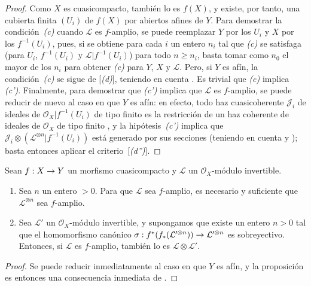 \documentclass[oneside,10pt]{amsart}
\makeatletter
\renewcommand{\geq}{\geqslant}
\newcommand{\ega@arrow}[2]{\mathchoice{#1}{#2}{#2}{#2}}
\renewcommand{\to}{\ega@arrow{\longrightarrow}{\rightarrow}}
\newcommand{\oldpage}[2][]{\marginnote{\normalfont\footnotesize\textbf{#1}~|~#2}\ignorespaces}
\let\EGAOriginalLabel\label
\renewcommand{\label}[1]{\phantomsection\EGAOriginalLabel{#1}}
\makeatother
\begin{document}
\begin{proof}
Como $X$ es cuasicompacto, también lo es $f(X)$, y existe, por tanto, una cubierta finita $(U_i)$ de $f(X)$ por abiertos afines de $Y$.
Para demostrar la condición~\emph{(c)} cuando $\mathcal{L}$ es $f$-amplio, se puede reemplazar $Y$ por los $U_i$ y $X$ por los $f^{-1}(U_i)$, pues, si se obtiene para cada $i$ un entero $n_i$ tal que \emph{(c)} se satisfaga (para $U_i$, $f^{-1}(U_i)$ y $\mathcal{L}|f^{-1}(U_i)$) para todo $n\geq n_i$, basta tomar como $n_0$ el mayor de los $n_i$ para obtener \emph{(c)} para $Y$, $X$ y $\mathcal{L}$.
Pero, si $Y$ es afín, la condición~\emph{(c)} se sigue de [\emph{(d)}], teniendo en cuenta .
Es trivial que \emph{(c)} implica \emph{(c')}.
Finalmente, para demostrar que \emph{(c')} implica que $\mathcal{L}$ es $f$-amplio, se puede reducir de nuevo al caso en que $Y$ es afín:
en efecto, todo haz cuasicoherente $\mathcal{J}_i$ de ideales de $\mathcal{O}_X|f^{-1}(U_i)$ de tipo finito es la restricción de un haz coherente de ideales de $\mathcal{O}_X$ de tipo finito , y la hipótesis~\emph{(c')} implica que
\oldpage[II]{91}
$\mathcal{J}_i\otimes(\mathcal{L}^{\otimes n}|f^{-1}(U_i))$ está generado por sus secciones (teniendo en cuenta  y );
basta entonces aplicar el criterio~[\emph{(d'')}].
\end{proof}

\begin{proposition}[4.6.9]
\label{II.4.6.9-fr}
Sean $f:X\to Y$ un morfismo cuasicompacto y $\mathcal{L}$ un $\mathcal{O}_X$-módulo invertible.
\begin{enumerate}
  \item[\rm{(i)}] Sea $n$ un entero $>0$.
    Para que $\mathcal{L}$ sea $f$-amplio, es necesario y suficiente que $\mathcal{L}^{\otimes n}$ sea $f$-amplio.
  \item[\rm{(ii)}] Sea $\mathcal{L}'$ un $\mathcal{O}_X$-módulo invertible, y supongamos que existe un entero $n>0$ tal que el homomorfismo canónico $\sigma:f^*(f_*(\mathcal{L}'^{\otimes n}))\to
  \mathcal{L}'^{\otimes n}$ es sobreyectivo.
    Entonces, si $\mathcal{L}$ es $f$-amplio, también lo es $\mathcal{L}\otimes\mathcal{L}'$.
\end{enumerate}
\end{proposition}

\begin{proof}
Se puede reducir inmediatamente al caso en que $Y$ es afín, y la proposición es entonces una consecuencia inmediata de .
\end{proof}
\end{document}
